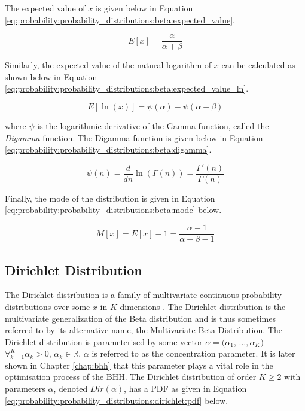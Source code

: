 The expected value of $x$ is given below in Equation \ref{eq:probability:probability_distributions:beta:expected_value}.

\begin{equation}
    \label{eq:probability:probability_distributions:beta:expected_value}
    E[x] = \frac{\alpha}{\alpha + \beta}
\end{equation}

Similarly, the expected value of the natural logarithm of $x$ can be calculated as shown below in Equation \ref{eq:probability:probability_distributions:beta:expected_value_ln}.

\begin{equation}
    \label{eq:probability:probability_distributions:beta:expected_value_ln}
    E[\ln(x)] = \psi({\alpha}) - \psi(\alpha + \beta)
\end{equation}

where $\psi$ is the logarithmic derivative of the Gamma function, called the \textit{Digamma} function. The Digamma function is given below in Equation \ref{eq:probability:probability_distributions:beta:digamma}.

\begin{equation}
    \label{eq:probability:probability_distributions:beta:digamma}
    \psi(n) = \frac{d}{dn}\ln(\Gamma(n)) = \frac{\Gamma'(n)}{\Gamma(n)}
\end{equation}

Finally, the mode of the distribution is given in Equation \ref{eq:probability:probability_distributions:beta:mode} below.

\begin{equation}
    \label{eq:probability:probability_distributions:beta:mode}
    M[x] = E[x] - 1 = \frac{\alpha - 1}{\alpha + \beta - 1}
\end{equation}










\subsection{Dirichlet Distribution}
\label{sec:probability:probability_distributions:dirichlet}


The Dirichlet distribution is a family of multivariate continuous probability distributions over some $x$ in $K$ dimensions  \cite{ref:wackerly:2014}. The Dirichlet distribution is the multivariate generalization of the Beta distribution and is thus sometimes referred to by its alternative name, the Multivariate Beta Distribution. The Dirichlet distribution is parameterised by some vector $\alpha = (\alpha_{1}$,  $\dots, \alpha_{K})$ $\forall_{k=1}^{K} \alpha_{k} > 0$, $\alpha_{k} \in \mathbb{R}$. $\alpha$ is referred to as the concentration parameter. It is later shown in Chapter \ref{chap:bhh} that this parameter plays a vital role in the optimisation process of the \ac{BHH}. The Dirichlet distribution of order $K \geq 2$ with parameters $\alpha$, denoted $Dir(\alpha)$, has a \ac{PDF} as given in Equation \ref{eq:probability:probability_distributions:dirichlet:pdf} below.

